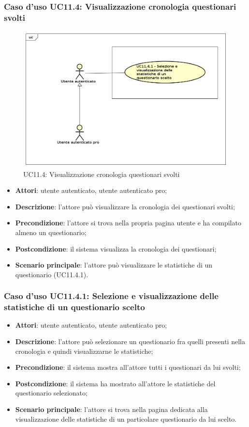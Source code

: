 \subsubsection{Caso d'uso UC11.4: Visualizzazione cronologia questionari svolti}
\label{UC11.4}
\begin{figure}[h]
	\centering
	\includegraphics[scale=0.5]{UML/UC11_4.png}
	\caption{UC11.4: Visualizzazione cronologia questionari svolti}
\end{figure}
\begin{itemize}
\item\textbf{Attori}: utente autenticato, utente autenticato pro;
\item\textbf{Descrizione}: l'attore può visualizzare la cronologia dei questionari svolti;
\item\textbf{Precondizione}: l'attore si trova nella propria pagina utente e ha compilato almeno un questionario;
\item\textbf{Postcondizione}: il sistema visualizza la cronologia dei questionari;
\item\textbf{Scenario principale}: l'attore può visualizzare le statistiche di un questionario (UC11.4.1).
\end{itemize}

\subsubsection{Caso d'uso UC11.4.1: Selezione e visualizzazione delle statistiche di un questionario scelto}
\begin{itemize}
\item\textbf{Attori}: utente autenticato, utente autenticato pro;
\item\textbf{Descrizione}: l'attore può selezionare un questionario fra quelli presenti nella cronologia e quindi visualizzarne le statistiche;
\item\textbf{Precondizione}: il sistema mostra all'attore tutti i questionari da lui svolti;
\item\textbf{Postcondizione}: il sistema ha mostrato all'attore le statistiche del questionario selezionato;
\item\textbf{Scenario principale}: l'attore si trova nella pagina dedicata alla visualizzazione delle statistiche di un particolare questionario da lui scelto.
\end{itemize}

